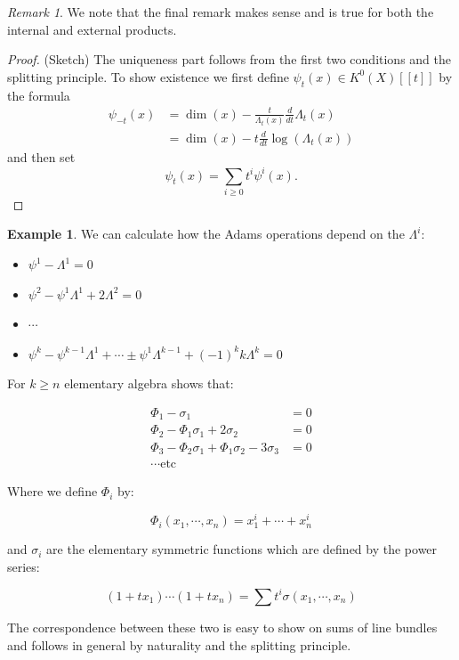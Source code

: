 \documentclass[a4paper,10pt]{article}
\theoremstyle{plain}%
\theoremstyle{definition}
\newtheorem{exmp}{Example}
\theoremstyle{remark}
\newtheorem{rem}{Remark}
\begin{document}
\begin{rem}
  We note that the final remark makes sense and is true for both the internal
  and external products.
\end{rem}

\begin{proof}(Sketch)
The uniqueness part follows from the first two conditions and the splitting principle. To show existence we first define $\psi_t(x)\in K^0(X)[[t]]$ by the formula
\begin{align*}
\psi_{-t}(x)&= \dim(x)-\frac{t}{\Lambda_t(x)}\frac{d}{dt}\Lambda_{t}(x)\\
&= \dim(x)-t\frac{d}{dt}\log(\Lambda_{t}(x))
\end{align*}
and then set 
$$\psi_t(x)=\sum_{i\geq 0}t^i\psi^i(x).$$
\end{proof}

\begin{exmp}
We can calculate how the Adams operations depend on the $\Lambda^i$:
\begin{itemize}
\item $\psi^1-\Lambda^1=0$
\item $\psi^2-\psi^1\Lambda^1+2\Lambda^2=0$
\item $\cdots$
\item $\psi^k-\psi^{k-1}\Lambda^1+\cdots\pm\psi^1\Lambda^{k-1}+(-1)^kk\Lambda^k=0$

\end{itemize}
\end{exmp}


For $k\geq n$ elementary algebra shows that:

\begin{align*}
  \Phi_1-\sigma_1&=0\\
  \Phi_2-\Phi_1\sigma_1+2\sigma_2&=0\\
  \Phi_3-\Phi_2\sigma_1+\Phi_1\sigma_2-3\sigma_3&=0\\
  \cdots \text{etc}
\end{align*}

Where we define $\Phi_i$ by:

$$\Phi_i(x_1,\cdots ,x_n)=x_1^i+\cdots +x_n^i$$

and $\sigma_i$ are the elementary symmetric functions which are defined by the
power series:

$$(1+t x_1)\cdots (1+t x_n)=\sum t^i\sigma(x_1,\cdots ,x_n)$$

The correspondence between these two is easy to show on sums of line bundles and
follows in general by naturality and the splitting principle.
\end{document}
